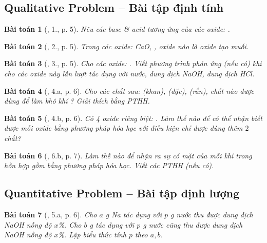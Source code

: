 \documentclass{article}
\newtheorem{baitoan}{Bài toán}
\begin{document}
\subsection{Qualitative Problem -- Bài tập định tính}

\begin{baitoan}[\cite{An_350_BT_Hoa_Hoc_9}, 1., p. 5]
	Nêu các base \& acid tương ứng của các oxide: \emph{}.
\end{baitoan}

\begin{baitoan}[\cite{An_350_BT_Hoa_Hoc_9}, 2., p. 5]
	Trong các oxide: \emph{CaO, }, oxide nào là oxide tạo muối.
\end{baitoan}

\begin{baitoan}[\cite{An_350_BT_Hoa_Hoc_9}, 3., p. 5]
	Cho các oxide: \emph{}. Viết phương trình phản ứng (nếu có) khi cho các oxide này lần lượt tác dụng với nước, dung dịch \emph{NaOH}, dung dịch \emph{HCl}.
\end{baitoan}

\begin{baitoan}[\cite{An_350_BT_Hoa_Hoc_9}, 4.a, p. 6]
	Cho các chất sau: \emph{ (khan),  (đặc),  (rắn)}, chất nào được dùng để làm khô khí \emph{}? Giải thích bằng PTHH.
\end{baitoan}

\begin{baitoan}[\cite{An_350_BT_Hoa_Hoc_9}, 4.b, p. 6]
	Có 4 oxide riêng biệt: \emph{}. Làm thế nào để có thể nhận biết được mỗi oxide bằng phương pháp hóa học với điều kiện chỉ được dùng thêm $2$ chất?
\end{baitoan}

\begin{baitoan}[\cite{An_350_BT_Hoa_Hoc_9}, 6.b, p. 7]
	Làm thế nào để nhận ra sự có mặt của mỗi khí trong hỗn hợp gồm \emph{} bằng phương pháp hóa học. Viết các PTHH (nếu có).
\end{baitoan}

\subsection{Quantitative Problem -- Bài tập định lượng}

\begin{baitoan}[\cite{An_350_BT_Hoa_Hoc_9}, 5.a, p. 6]
	Cho $a$ \emph{g Na} tác dụng với $p$ \emph{g} nước thu được dung dịch \emph{NaOH} nồng độ $x$\%. Cho $b$ \emph{g } tác dụng với $p$ \emph{g} nước cũng thu được dung dịch \emph{NaOH} nồng độ $x$\%. Lập biểu thức tính $p$ theo $a,b$.
\end{baitoan}
\end{document}
